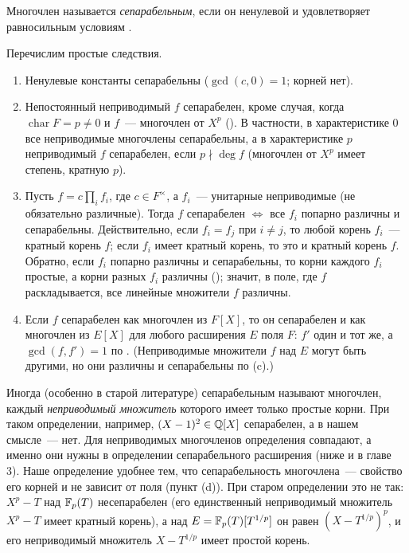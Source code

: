 \begin{definition}[2.22]
Многочлен называется \emph{сепарабельным}, если он ненулевой и удовлетворяет равносильным условиям .
\end{definition}

Перечислим простые следствия.
\begin{enumerate}[label=(\alph*)]
\item Ненулевые константы сепарабельны ($\gcd(c,0)=1$; корней нет).
\item Непостоянный неприводимый $f$ сепарабелен, кроме случая, когда $\operatorname{char}F=p\ne0$ и $f$~--- многочлен от
$X^p$ (). В частности, в характеристике $0$ все неприводимые многочлены сепарабельны, а в характеристике $p$
неприводимый $f$ сепарабелен, если $p\nmid\deg f$ (многочлен от $X^p$ имеет степень, кратную $p$).
\item Пусть $f=c\prod_if_i$, где $c\in F^\times$, а $f_i$~--- унитарные неприводимые (не обязательно различные). Тогда $f$
сепарабелен $\iff$ все $f_i$ попарно различны и сепарабельны. Действительно, если $f_i=f_j$ при $i\ne j$, то любой корень
$f_i$~--- кратный корень $f$; если $f_i$ имеет кратный корень, то это и кратный корень $f$. Обратно, если $f_i$ попарно
различны и сепарабельны, то корни каждого $f_i$ простые, а корни разных $f_i$ различны (); значит, в поле, где
$f$ раскладывается, все линейные множители $f$ различны.
\item Если $f$ сепарабелен как многочлен из $F[X]$, то он сепарабелен и как многочлен из $E[X]$ для любого расширения $E$
поля $F$: $f'$ один и тот же, а $\gcd(f,f')=1$ по . (Неприводимые множители $f$ над $E$ могут быть другими,
но они различны и сепарабельны по (c).)
\end{enumerate}

\begin{remark}[2.22a]
Иногда (особенно в старой литературе) сепарабельным называют многочлен, каждый \emph{неприводимый множитель} которого
имеет только простые корни. При таком определении, например, $(X-1)^2\in\mathbb Q[X]$ сепарабелен, а в нашем смысле~--- нет.
Для неприводимых многочленов определения совпадают, а именно они нужны в определении сепарабельного расширения (ниже и в
главе 3). Наше определение удобнее тем, что сепарабельность многочлена~--- свойство его корней и не зависит от поля
(пункт (d)). При старом определении это не так: $X^p-T$ над $\mathbb F_p(T)$ несепарабелен (его единственный неприводимый
множитель $X^p-T$ имеет кратный корень), а над $E=\mathbb F_p(T)[T^{1/p}]$ он равен $(X-T^{1/p})^p$, и его неприводимый
множитель $X-T^{1/p}$ имеет простой корень.
\end{remark}

